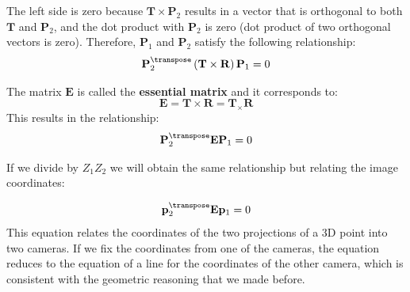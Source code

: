 The left side is zero because $\mathbf{T} \times \mathbf{P}_2$ results in a vector that is orthogonal to both $\mathbf{T}$ and $\mathbf{P}_2$, and the dot product with $\mathbf{P}_2$ is zero (dot product of two orthogonal vectors is zero). Therefore, $\mathbf{P}_1$ and $\mathbf{P}_2$ satisfy the following relationship:
\begin{equation}
    \mathbf{P}_2^\transpose \left( \mathbf{T} \times \mathbf{R} \right) \mathbf{P}_1 = 0
\end{equation}



The matrix $\mathbf{E}$ is called the {\bf essential matrix} and it corresponds to: 
\begin{equation}
    \mathbf{E} =  \mathbf{T} \times \mathbf{R} = \mathbf{T}_{\times} \mathbf{R}
\end{equation}
This results in the relationship:
\begin{equation}
    \mathbf{P}_2^\transpose \mathbf{E} \mathbf{P}_1 = 0
    \label{eq:relation3}
\end{equation}

If we divide \eqn{\ref{eq:relation3}} by $Z_1 Z_2$ we will obtain the same relationship but relating the image coordinates:

\begin{equation}
    \mathbf{p}_2^\transpose \mathbf{E} \mathbf{p}_1 = 0
    \label{eq:relation4}
\end{equation}
This equation relates the coordinates of the two projections of a 3D point into two cameras. If we fix the coordinates from one of the cameras, the equation reduces to the equation of a line for the coordinates of the other camera, which is consistent with the geometric reasoning that we made before.


